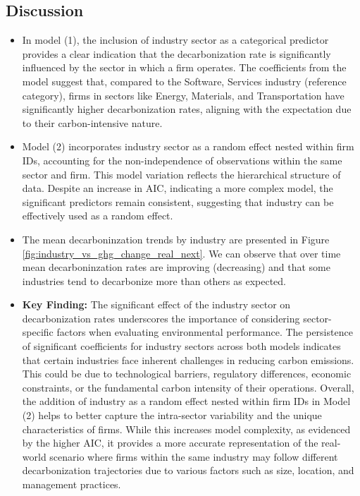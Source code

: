 \subsection{Discussion}
\begin{itemize}
    \item In model (1), the inclusion of industry sector as a categorical predictor provides a clear indication that the decarbonization rate is significantly influenced by the sector in which a firm operates. The coefficients from the model suggest that, compared to the Software, Services industry (reference category), firms in sectors like Energy, Materials, and Transportation have significantly higher decarbonization rates, aligning with the expectation due to their carbon-intensive nature.
    \item Model (2) incorporates industry sector as a random effect nested within firm IDs, accounting for the non-independence of observations within the same sector and firm. This model variation reflects the hierarchical structure of data. Despite an increase in AIC, indicating a more complex model, the significant predictors remain consistent, suggesting that industry can be effectively used as a random effect.
    \item The mean decarboninzation trends by industry are presented in Figure \ref{fig:industry_vs_ghg_change_real_next}. We can observe that over time mean decarboninzation rates are improving (decreasing) and that some industries tend to decarbonize more than others as expected.
    \item \textbf{Key Finding:} The significant effect of the industry sector on decarbonization rates underscores the importance of considering sector-specific factors when evaluating environmental performance. The persistence of significant coefficients for industry sectors across both models indicates that certain industries face inherent challenges in reducing carbon emissions. This could be due to technological barriers, regulatory differences, economic constraints, or the fundamental carbon intensity of their operations. Overall, the addition of industry as a random effect nested within firm IDs in Model (2) helps to better capture the intra-sector variability and the unique characteristics of firms. While this increases model complexity, as evidenced by the higher AIC, it provides a more accurate representation of the real-world scenario where firms within the same industry may follow different decarbonization trajectories due to various factors such as size, location, and management practices.
    
\end{itemize}

